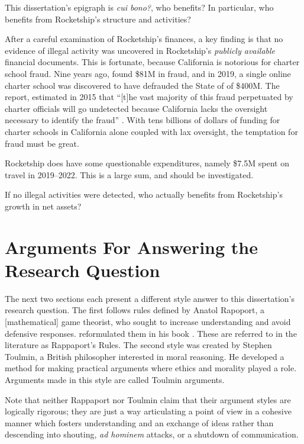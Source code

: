 This dissertation's epigraph is \textit{cui bono?}, who benefits? In particular, who benefits from Rocketship's structure 
and activities?

After a careful examination of Rocketship's finances, a key finding is that no evidence of illegal activity was uncovered in Rocketship's \textit{publicly available} financial documents. This is fortunate, because California is notorious for charter school fraud. Nine years ago, \textcite{CPD2015} found \$81M in fraud, and in 2019, a single online charter school was discovered to have defrauded the State of  of \$400M. The report,  estimated in 2015 that ``[t]he vast majority of this fraud perpetuated by charter officials will go undetected because California lacks the oversight necessary to identify the fraud'' \parencite[2]{CPD2015}. With tens billions of dollars of funding for charter schools in California alone coupled with lax oversight, the temptation for fraud must be great. 

Rocketship does have some questionable expenditures, namely \$7.5M spent on travel in 2019–2022. This is a large sum, and should be investigated.

If no illegal activities were detected,  who actually benefits from Rocketship's growth in net assets?

\section{Arguments For Answering the Research Question}\label{sec:appr-answ-rese-quest}\indent

The next two sections each present a different style answer to this dissertation's research question. The first follows rules defined by Anatol Rapoport, a [mathematical] game theorist, who sought to increase understanding and avoid defensive responses. \citeauthor{Dennett2013} reformulated them in his book  \parencite{Dennett2013}. These are referred to in the literature as Rappaport's Rules. The second style was created by Stephen Toulmin, a British philosopher interested in moral reasoning. He developed a method for making practical arguments where ethics and morality played a role. Arguments made in this style are called Toulmin arguments. %

Note that neither Rappaport nor Toulmin claim that their argument styles are logically rigorous; they are just a way articulating a point of view in a cohesive manner which fosters understanding and an exchange of ideas rather than descending into shouting, \textit{ad hominem} attacks, or a shutdown of communication.


